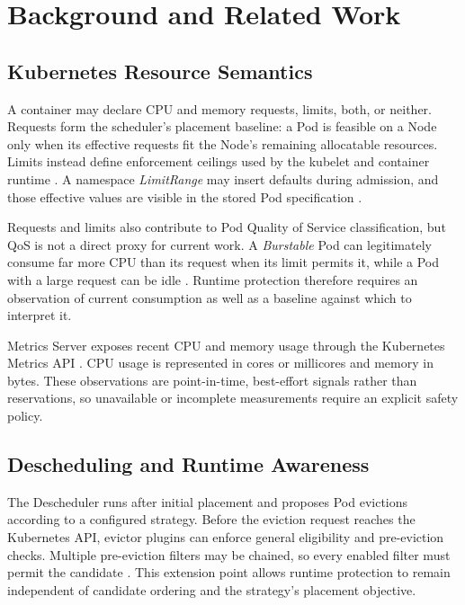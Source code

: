 \section{Background and Related Work}
\label{sec:background}

\subsection{Kubernetes Resource Semantics}

A container may declare CPU and memory requests, limits, both, or neither.
Requests form the scheduler's placement baseline: a Pod is feasible on a Node
only when its effective requests fit the Node's remaining allocatable
resources. Limits instead define enforcement ceilings used by the kubelet and
container runtime \citep{k8s_resource_management}. A namespace
\textit{LimitRange} may insert defaults during admission, and those effective
values are visible in the stored Pod specification
\citep{k8s_limit_range}.

Requests and limits also contribute to Pod Quality of Service classification,
but QoS is not a direct proxy for current work. A \textit{Burstable} Pod can
legitimately consume far more CPU than its request when its limit permits it,
while a Pod with a large request can be idle
\citep{k8s_pod_qos}. Runtime protection therefore requires an observation of
current consumption as well as a baseline against which to interpret it.

Metrics Server exposes recent CPU and memory usage through the Kubernetes
Metrics API \citep{k8s_metrics_server}. CPU usage is represented in cores or
millicores and memory in bytes. These observations are point-in-time,
best-effort signals rather than reservations, so unavailable or incomplete
measurements require an explicit safety policy.

\subsection{Descheduling and Runtime Awareness}

The Descheduler runs after initial placement and proposes Pod evictions
according to a configured strategy. Before the eviction request reaches the
Kubernetes API, evictor plugins can enforce general eligibility and
pre-eviction checks. Multiple pre-eviction filters may be chained, so every
enabled filter must permit the candidate
\citep{k8s_descheduler_docs}. This extension point allows runtime protection
to remain independent of candidate ordering and the strategy's placement
objective.

